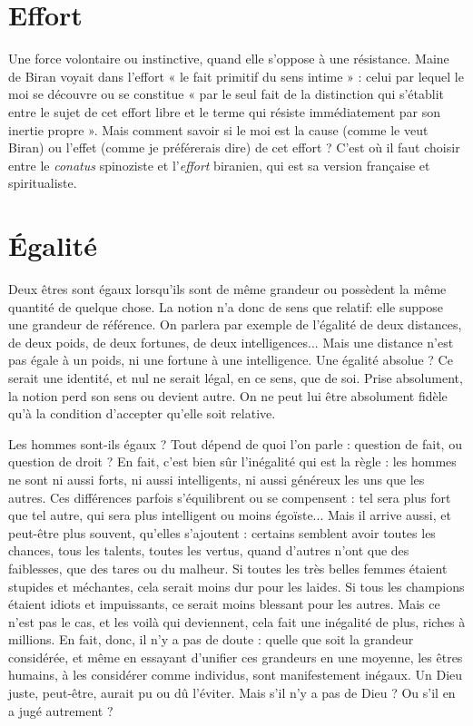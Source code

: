 \section{Effort}
Une force volontaire ou instinctive, quand elle s'oppose à une
résistance. Maine de Biran voyait dans l’effort « le fait primitif du
sens intime » : celui par lequel le moi se découvre ou se constitue « par le seul
fait de la distinction qui s'établit entre le sujet de cet effort libre et le terme qui
résiste immédiatement par son inertie propre ». Mais comment savoir si le moi
est la cause (comme le veut Biran) ou l'effet (comme je préférerais dire) de cet
effort ? C’est où il faut choisir entre le {\it conatus} spinoziste et l'{\it effort} biranien, qui
est sa version française et spiritualiste.

\section{Égalité}
Deux êtres sont égaux lorsqu'ils sont de même grandeur ou possèdent
la même quantité de quelque chose. La notion n’a donc de
sens que relatif: elle suppose une grandeur de référence. On parlera par
exemple de l'égalité de deux distances, de deux poids, de deux fortunes, de
deux intelligences... Mais une distance n’est pas égale à un poids, ni une fortune
à une intelligence. Une égalité absolue ? Ce serait une identité, et nul ne
serait légal, en ce sens, que de soi. Prise absolument, la notion perd son sens ou
devient autre. On ne peut lui être absolument fidèle qu’à la condition
d’accepter qu’elle soit relative.

Les hommes sont-ils égaux ? Tout dépend de quoi l’on parle : question de
fait, ou question de droit ? En fait, c’est bien sûr l'inégalité qui est la règle : les
hommes ne sont ni aussi forts, ni aussi intelligents, ni aussi généreux les uns
que les autres. Ces différences parfois s’équilibrent ou se compensent : tel sera
plus fort que tel autre, qui sera plus intelligent ou moins égoïste... Mais il
arrive aussi, et peut-être plus souvent, qu’elles s'ajoutent : certains semblent
avoir toutes les chances, tous les talents, toutes les vertus, quand d’autres n’ont
que des faiblesses, que des tares ou du malheur. Si toutes les très belles femmes
étaient stupides et méchantes, cela serait moins dur pour les laides. Si tous les
champions étaient idiots et impuissants, ce serait moins blessant pour les
autres. Mais ce n’est pas le cas, et les voilà qui deviennent, cela fait une inégalité
de plus, riches à millions. En fait, donc, il n’y a pas de doute : quelle que soit
la grandeur considérée, et même en essayant d’unifier ces grandeurs en une
moyenne, les êtres humains, à les considérer comme individus, sont manifestement
inégaux. Un Dieu juste, peut-être, aurait pu ou dû l’éviter. Mais s’il n’y
a pas de Dieu ? Ou s’il en a jugé autrement ?

